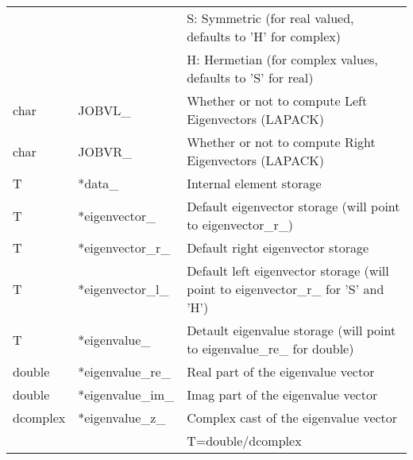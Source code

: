\documentclass[english,journal=jctcce,manuscript=article,etalmode=truncate,maxauthors=0]{article}
\begin{document}
\begin{table}[h!]
\begin{tabular}{| l | l | l |}
        &                       &   S: Symmetric (for real valued, defaults to 'H' for complex)\\
        &                       &   H: Hermetian (for complex values, defaults to 'S' for real)\\
  char  &    JOBVL\_            & Whether or not to compute Left Eigenvectors  (LAPACK)\\
  char  &    JOBVR\_            & Whether or not to compute Right Eigenvectors (LAPACK)\\
  T     &    *data\_            & Internal element storage\\
  T     &    *eigenvector\_     & Default eigenvector storage (will point to eigenvector\_r\_)\\
  T     &    *eigenvector\_r\_   & Default right eigenvector storage\\
  T     &    *eigenvector\_l\_   & Default left eigenvector storage (will point to eigenvector\_r\_ for 'S' and 'H')\\
  T     &    *eigenvalue\_      & Detault eigenvalue storage (will point to eigenvalue\_re\_ for double)\\
  double&    *eigenvalue\_re\_   & Real part of the eigenvalue vector\\
  double&    *eigenvalue\_im\_   & Imag part of the eigenvalue vector\\
  dcomplex&  *eigenvalue\_z\_    & Complex cast of the eigenvalue vector\\
\hline
& &T=double/dcomplex \\
\hline
\end{tabular}
\end{table}
\end{document}
